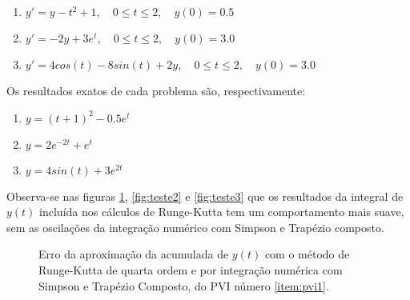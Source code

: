 \documentclass[final,5p]{elsarticle}
\numberwithin{equation}{section}
\begin{document}
        \begin{enumerate}
            \item $y' = y - t^2 + 1, \quad 0 \leq t \leq  2, \quad y(0) = 0.5$ \label{item:pvi1}
            \item $y' = -2y + 3 e^t, \quad 0 \leq t \leq  2, \quad y(0) = 3.0$ \label{item:pvi2}
            \item $y' = 4 cos(t) - 8 sin(t) + 2 y, \quad 0 \leq t \leq  2, \quad y(0) = 3.0$ \label{item:pvi3}
        \end{enumerate}

        Os resultados exatos de cada problema são, respectivamente:

        \begin{enumerate}
            \item $y = (t+1)^2 - 0.5 e^t$
            \item $y = 2 e^{-2 t} + e^t$
            \item $y = 4 sin(t) + 3 e^{2 t}$
        \end{enumerate}

        Observa-se nas figuras \ref{fig:teste1}, \ref{fig:teste2} e \ref{fig:teste3} que os resultados da integral de $y(t)$ incluída nos cálculos de Runge-Kutta tem um comportamento mais suave, sem as oscilações da integração numérico com Simpson e Trapézio composto.

        \begin{figure}[hbt!]
            \caption{Erro da aproximação da acumulada de $y(t)$ com o método de Runge-Kutta de quarta ordem e por integração numérica com Simpson e Trapézio Composto, do PVI número \ref{item:pvi1}.}
            \label{fig:teste1}
        \end{figure}
\end{document}
